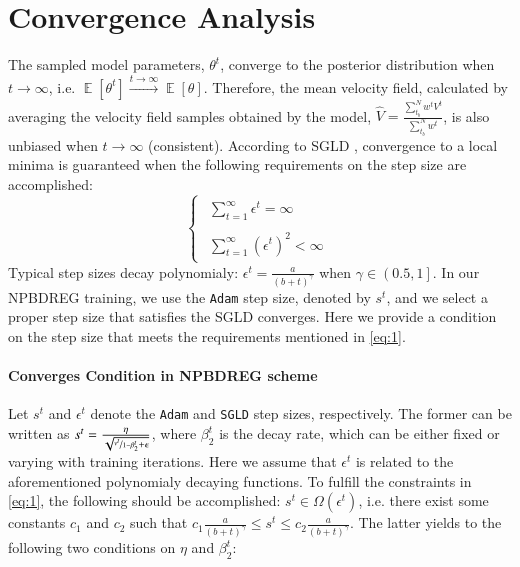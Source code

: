 \documentclass[preprint,authoryear]{elsarticle}
\DeclareMathOperator{\E}{\mathbb{E}}
\begin{document}
\section{Convergence Analysis} \label{app:1}
The sampled model parameters, $\theta^{t}$, converge to the posterior distribution when $t\rightarrow\infty$, i.e. $\E\left[\theta^{t}\right]\overset{t\rightarrow\infty}{\longrightarrow}\E\left[\theta\right]$. Therefore, the mean velocity field, calculated by averaging the velocity field samples obtained by the model, $\hat{V}=\tfrac{\sum_{t_b}^{N}w^t V^t}{\sum_{t_b}^{N}w^t}$, is also unbiased when $t\rightarrow\infty$ (consistent). According to SGLD \cite{welling2011bayesian}, convergence to a local minima is guaranteed when the following requirements on the step size are accomplished:
\begin{equation}
\begin{cases}
\begin{array}{c}
\sum_{t=1}^{\infty}\epsilon^{t}=\infty\\
\\
\sum_{t=1}^{\infty}(\epsilon^t)^{2}<\infty
\end{array}\end{cases}
\label{eq:1}
\end{equation}
Typical step sizes decay polynomialy: $\epsilon^{t}=\frac{a}{(b+t)^\gamma}$ when $\gamma\in\left(0.5,1\right]$. In our NPBDREG training, we use the \texttt{Adam} step size, denoted by $s^{t}$, and we select a proper step size that satisfies the SGLD converges. Here we provide a condition on the step size that meets the requirements mentioned in \eqref{eq:1}.  
\paragraph{Converges Condition in NPBDREG scheme}
Let $s^t$ and $\epsilon^t$ denote the \texttt{Adam} and \texttt{SGLD} step sizes, respectively. The former can be written as $s^t=\tfrac{\eta}{\sqrt{\nicefrac{v^{t}}{1-\beta_{2}^{t}}+\epsilon}}$, where  $\beta_{2}^{t}$ is the decay rate, which can be either fixed or varying with training iterations. Here we assume that $\epsilon^t$ is related to the aforementioned polynomialy decaying functions. To fulfill the constraints in \eqref{eq:1}, the following should be accomplished: $s^t\in \Omega\left(\epsilon^t \right)$, i.e. there exist some constants $c_1$ and $c_2$ such that $c_1\frac{a}{(b+t)^\gamma}\leq s^t \leq c_2\frac{a}{(b+t)^\gamma}$. The latter yields to the following two conditions on $\eta$ and $\beta_2^t$: 
 
\end{document}

